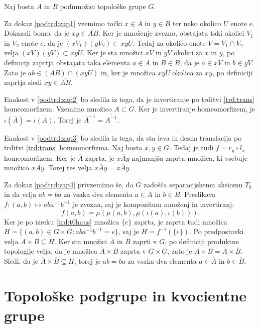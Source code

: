 \documentclass[mat1]{fmfdelo}
\newcommand{\closure}[1]{\overline{#1}}
\begin{document}
\begin{dokaz}
	Naj bosta $A$ in $B$ podmnožici topološke grupe $G$.
	
	Za dokaz \ref{podtrd:zap1} vzemimo točki $x \in \closure{A}$ in $y \in \closure{B}$ ter neko okolico $U$ enote $e$. Dokazali bomo, da je $xy \in \closure{AB}$.
	Ker je množenje zvezno, obstajata taki okolici $V_1$ in $V_2$ enote $e$, da je $(xV_1)(yV_2) \subset xyU$. Tedaj za okolico enote $V = V_1 \cap V_2$ velja $(xV)(yV) \subset xyU$. Ker je sta množici $xV$ in $yV$ okolici za $x$ in $y$,
	po definiciji zaprtja obstajata taka elementa $a \in A$ in $B \in B$, da je $a \in xV$ in $b \in yV$. Zato je $ab \in (AB) \cap (xyU)$ in, ker je množica $xyU$ okolica za $xy$, po definiciji zaprtja sledi $xy \in \closure{AB}$.
	
	Enakost v \ref{podtrd:zap2} bo sledila iz tega, da je invertiranje po trditvi \ref{trd:trans} homeomorfizem. Vzemimo množico $A \subset G$. Ker je invertiranje homeomorfizem, je $\iota(\closure{A}) = \closure{\iota(A)}$. Torej je $\closure{A}^{-1} = \closure{A^{-1}}$.
	
	Enakost v \ref{podtrd:zap3} bo sledila iz tega, da sta leva in desna translacija po trditvi \ref{trd:trans} homeomorfizma. Naj bosta $x, y \in G$. Tedaj je tudi $f = r_y \circ l_x$ homeomorfizem. Ker je $\closure{A}$ zaprta, je $x\closure{A}y$ najmanjša zaprta množica, ki vsebuje množico $xAy$. Torej res velja $x\closure{A}y = \closure{xAy}$.
	
	Za dokaz \ref{podtrd:zap4} privzemimo še, da $G$ zadošča separacijskemu aksiomu $T_0$ in da velja $ab = ba$ za vsaka dva elementa $a \in A$ in $b \in B$. Preslikava $f\colon (a,b) \mapsto aba^{-1}b^{-1}$ je zvezna, saj je kompozitum množenj in invertiranj:
	\[ f(a, b) = \mu(\mu(a, b),\mu(\iota(a), \iota(b))). \]
	Ker je po izreku \ref{trd:t0haus} množica $\lbrace e \rbrace$ zaprta, je zaprta tudi množica $H = \lbrace (a, b) \in G \times G; aba^{-1}b^{-1} = e \rbrace$, saj je $H = f^{-1}(\lbrace e \rbrace)$. Po predpostavki velja $A \times B \subseteq H$.
	Ker sta množici $\closure{A}$ in $\closure{B}$ zaprti v $G$, po definiciji produktne topologije velja, da je množica $\closure{A} \times \closure{B}$ zaprta v $G \times G$, zato je $\closure{A \times B} = \closure{A} \times \closure{B}$. Sledi, da je $\closure{A} \times \closure{B} \subseteq H$, torej je $ab = ba$ za vsaka dva elementa $a \in \closure{A}$ in $b \in \closure{B}$.
\end{dokaz}

\section{Topološke podgrupe in kvocientne grupe}
\end{document}
